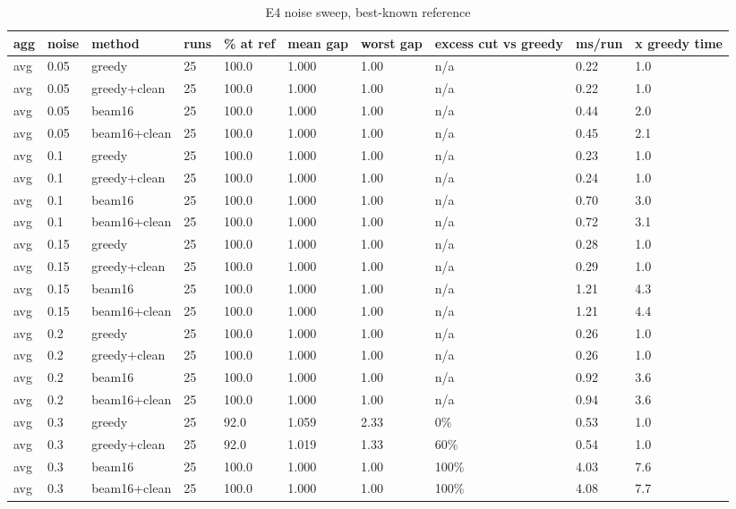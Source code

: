 \begin{table}[t]\centering\small
\caption{E4 noise sweep, best-known reference}
\begin{tabular}{llllllllll}
\toprule
agg & noise & method & runs & \% at ref & mean gap & worst gap & excess cut vs greedy & ms/run & x greedy time \\
\midrule
avg & 0.05 & greedy & 25 & 100.0 & 1.000 & 1.00 & n/a & 0.22 & 1.0 \\
avg & 0.05 & greedy+clean & 25 & 100.0 & 1.000 & 1.00 & n/a & 0.22 & 1.0 \\
avg & 0.05 & beam16 & 25 & 100.0 & 1.000 & 1.00 & n/a & 0.44 & 2.0 \\
avg & 0.05 & beam16+clean & 25 & 100.0 & 1.000 & 1.00 & n/a & 0.45 & 2.1 \\
avg & 0.1 & greedy & 25 & 100.0 & 1.000 & 1.00 & n/a & 0.23 & 1.0 \\
avg & 0.1 & greedy+clean & 25 & 100.0 & 1.000 & 1.00 & n/a & 0.24 & 1.0 \\
avg & 0.1 & beam16 & 25 & 100.0 & 1.000 & 1.00 & n/a & 0.70 & 3.0 \\
avg & 0.1 & beam16+clean & 25 & 100.0 & 1.000 & 1.00 & n/a & 0.72 & 3.1 \\
avg & 0.15 & greedy & 25 & 100.0 & 1.000 & 1.00 & n/a & 0.28 & 1.0 \\
avg & 0.15 & greedy+clean & 25 & 100.0 & 1.000 & 1.00 & n/a & 0.29 & 1.0 \\
avg & 0.15 & beam16 & 25 & 100.0 & 1.000 & 1.00 & n/a & 1.21 & 4.3 \\
avg & 0.15 & beam16+clean & 25 & 100.0 & 1.000 & 1.00 & n/a & 1.21 & 4.4 \\
avg & 0.2 & greedy & 25 & 100.0 & 1.000 & 1.00 & n/a & 0.26 & 1.0 \\
avg & 0.2 & greedy+clean & 25 & 100.0 & 1.000 & 1.00 & n/a & 0.26 & 1.0 \\
avg & 0.2 & beam16 & 25 & 100.0 & 1.000 & 1.00 & n/a & 0.92 & 3.6 \\
avg & 0.2 & beam16+clean & 25 & 100.0 & 1.000 & 1.00 & n/a & 0.94 & 3.6 \\
avg & 0.3 & greedy & 25 & 92.0 & 1.059 & 2.33 & 0\% & 0.53 & 1.0 \\
avg & 0.3 & greedy+clean & 25 & 92.0 & 1.019 & 1.33 & 60\% & 0.54 & 1.0 \\
avg & 0.3 & beam16 & 25 & 100.0 & 1.000 & 1.00 & 100\% & 4.03 & 7.6 \\
avg & 0.3 & beam16+clean & 25 & 100.0 & 1.000 & 1.00 & 100\% & 4.08 & 7.7 \\

\end{tabular}
\end{table}
